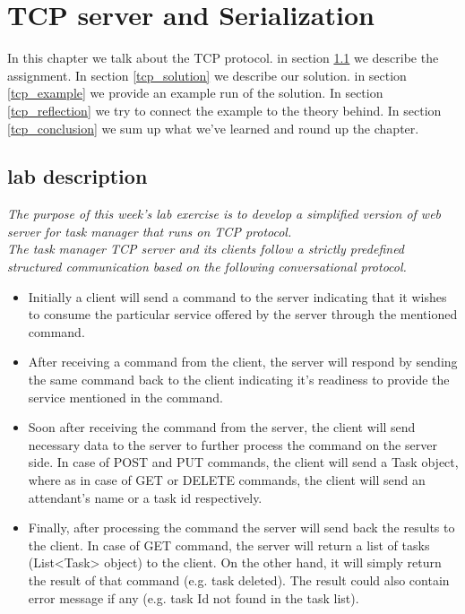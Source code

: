 \chapter{TCP server and Serialization}
\minitoc

In this chapter we talk about the TCP protocol. in section \ref{tcp_lab} we describe the assignment. In section \ref{tcp_solution} we describe our solution. in section \ref{tcp_example} we provide an example run of the solution. In section \ref{tcp_reflection} we try to connect the example to the theory behind. In section \ref{tcp_conclusion} we sum up what we've learned and round up the chapter.

\section{lab description}
\label{tcp_lab}
\textit{The purpose of this week’s lab exercise is to develop a simplified version of web server for task manager that runs on TCP protocol.}\\

\textit{The task manager TCP server and its clients follow a strictly predefined structured communication based on the following conversational protocol.}

\begin{itemize}
\item Initially a client will send a command to the server indicating that it wishes to consume the particular service offered by the server through the mentioned command.\\

\item After receiving a command from the client, the server will respond by sending the same command back to the client indicating it’s readiness to provide the service mentioned in the command.\\

\item Soon after receiving the command from the server, the client will send necessary data to the server to further process the command on the server side. In case of POST and PUT commands, the client will send a Task object, where as in case of GET or DELETE commands, the client will send an attendant’s name or a task id respectively.\\

\item Finally, after processing the command the server will send back the results to the client. In case of GET command, the server will return a list of tasks (List<Task> object) to the client. On the other hand, it will simply return the result of that command (e.g. task deleted). The result could also contain error message if any (e.g. task Id not found in the task list).


\end{itemize}

